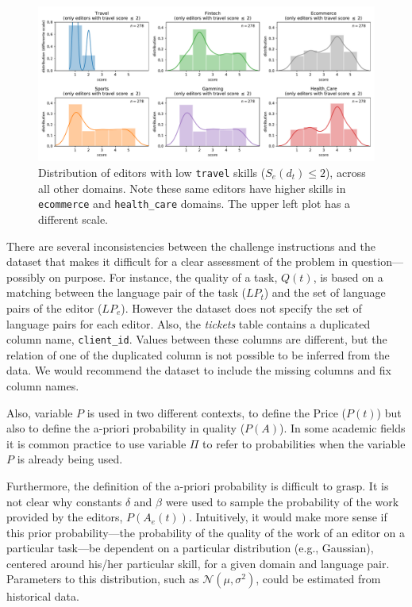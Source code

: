 \documentclass[10pt, a4paper]{article}
\begin{document}
\begin{figure}[h!]
    \centering
    \includegraphics[width=\textwidth]{images/transferable-skills}
    \caption{
        Distribution of editors with low \texttt{travel} skills ($S_e(d_t) \leq 2$), across all other domains.
        Note these same editors have higher skills in \texttt{ecommerce} and \texttt{health\_care} domains.
        The upper left plot has a different scale.
    }
    \label{fig:tranferable-skills}
\end{figure}


There are several inconsistencies between the challenge instructions and the dataset that makes it difficult for a clear assessment of the problem in question---possibly on purpose.
%
For instance, the quality of a task, $Q(t)$, is based on a matching between the language pair of the task ($LP_{t}$) and the set of language pairs of the editor ($LP_{e}$). However the dataset does not specify the set of language pairs for each editor.
%
Also, the \textit{tickets} table contains a duplicated column name, \texttt{client\_id}. Values between these columns are different, but the relation of one of the duplicated column is not possible to be inferred from the data.
%
We would recommend the dataset to include the missing columns and fix column names.


Also, variable $P$ is used in two different contexts, to define the Price ($P(t)$) but also to define the a-priori probability in quality ($P(A)$).
%
In some academic fields it is common practice to use variable $\Pi$ to refer to probabilities when the variable $P$ is already being used.


Furthermore, the definition of the a-priori probability is difficult to grasp. It is not clear why constants $\delta$ and $\beta$ were used to sample the probability of the work provided by the editors, $P(A_e(t))$.
%
Intuitively, it would make more sense if this prior probability---the probability of the quality of the work of an editor on a particular task---be dependent on a particular distribution (e.g., Gaussian), centered around his/her particular skill, for a given domain and language pair.
%
Parameters to this distribution, such as $\mathcal{N}(\mu,\sigma^2)$, could be estimated from historical data.
\end{document}
